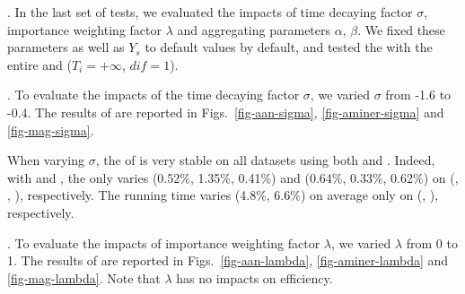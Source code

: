 .
In the last set of tests, we evaluated the impacts of time decaying factor $\sigma$, importance weighting factor $\lambda$ and aggregating parameters $\alpha$, $\beta$. We fixed these parameters as well as $Y_s$ to default values by default, and tested the \PairAcc with the entire \recom and \fcita (\ie $T_i=+\infty$, $dif=1$).





.
To evaluate the impacts of the time decaying factor $\sigma$, we varied $\sigma$ from -1.6 to -0.4.
The results of \PairAcc are reported in Figs.~\ref{fig-aan-sigma}, \ref{fig-aminer-sigma} and \ref{fig-mag-sigma}.


When varying $\sigma$, the \PairAcc of \ensemblerank is very stable on all datasets using both \recom and \fcita. Indeed, with \recom and \fcita, the \PairAcc only varies (0.52\%, 1.35\%, 0.41\%) and (0.64\%, 0.33\%, 0.62\%) on (\aan, \aminer, \magdata), respectively.
%
The running time varies (4.8\%, 6.6\%) on average only on (\aminer, \magdata), respectively.




.
To evaluate the impacts of importance weighting factor $\lambda$, we varied $\lambda$ from 0 to 1.
The results of \PairAcc are reported in Figs.~\ref{fig-aan-lambda}, \ref{fig-aminer-lambda} and \ref{fig-mag-lambda}. Note that $\lambda$ has no impacts on efficiency.

